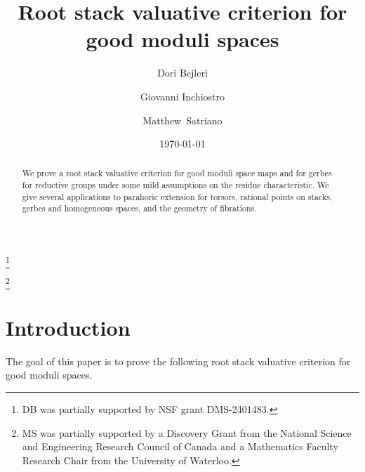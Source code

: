 \documentclass{amsart}
\theoremstyle{definition}
\begin{document}
\title{Root stack valuative criterion for good moduli spaces}

\author{Dori Bejleri}
\thanks{DB was partially supported by NSF grant DMS-2401483.}
\address[DB]{Department of Mathematics, University of Maryland, College Park, MD, 20742}

\author[Giovanni Inchiostro]{Giovanni Inchiostro}
	\address[GI]{Department of Mathematics, University of Washington, Seattle, Washington, USA}

\author{Matthew~Satriano}
\thanks{MS was partially supported by a Discovery Grant from the
  National Science and Engineering Research Council of Canada and a Mathematics Faculty Research Chair from the University of Waterloo.}
\address[MS]{Department of Pure Mathematics, University
  of Waterloo, Waterloo ON N2L3G1, Canada}

\date{\today}
\keywords{}
\subjclass[2020]{}


\begin{abstract} We prove a root stack valuative criterion for good moduli space maps and for gerbes for reductive groups under some mild assumptions on the residue characteristic. We give several applications to parahoric extension for torsors, rational points on stacks, gerbes and homogeneous spaces, and the geometry of fibrations.
\end{abstract}

\maketitle





\section{Introduction}

The goal of this paper is to prove the following root stack valuative criterion for good moduli spaces. 
\end{document}
